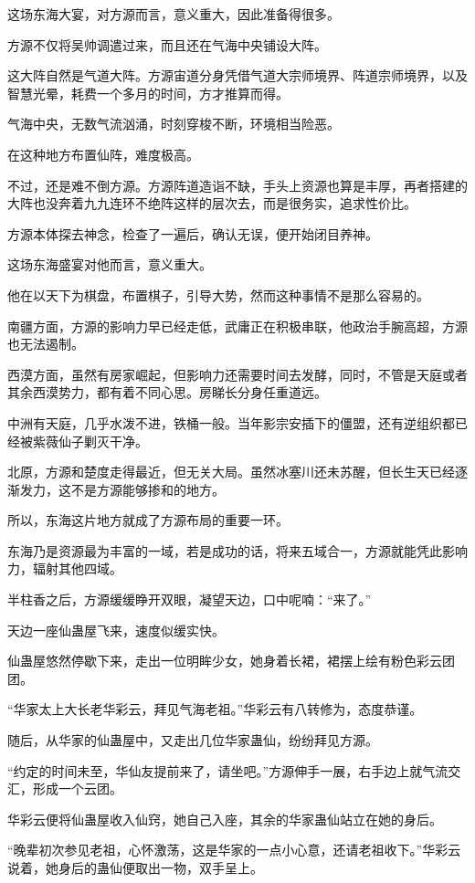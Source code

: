 \begin{this_body}
这场东海大宴，对方源而言，意义重大，因此准备得很多。

方源不仅将吴帅调遣过来，而且还在气海中央铺设大阵。

这大阵自然是气道大阵。方源宙道分身凭借气道大宗师境界、阵道宗师境界，以及智慧光晕，耗费一个多月的时间，方才推算而得。

气海中央，无数气流汹涌，时刻穿梭不断，环境相当险恶。

在这种地方布置仙阵，难度极高。

不过，还是难不倒方源。方源阵道造诣不缺，手头上资源也算是丰厚，再者搭建的大阵也没奔着九九连环不绝阵这样的层次去，而是很务实，追求性价比。

方源本体探去神念，检查了一遍后，确认无误，便开始闭目养神。

这场东海盛宴对他而言，意义重大。

他在以天下为棋盘，布置棋子，引导大势，然而这种事情不是那么容易的。

南疆方面，方源的影响力早已经走低，武庸正在积极串联，他政治手腕高超，方源也无法遏制。

西漠方面，虽然有房家崛起，但影响力还需要时间去发酵，同时，不管是天庭或者其余西漠势力，都有着不同心思。房睇长分身任重道远。

中洲有天庭，几乎水泼不进，铁桶一般。当年影宗安插下的僵盟，还有逆组织都已经被紫薇仙子剿灭干净。

北原，方源和楚度走得最近，但无关大局。虽然冰塞川还未苏醒，但长生天已经逐渐发力，这不是方源能够掺和的地方。

所以，东海这片地方就成了方源布局的重要一环。

东海乃是资源最为丰富的一域，若是成功的话，将来五域合一，方源就能凭此影响力，辐射其他四域。

半柱香之后，方源缓缓睁开双眼，凝望天边，口中呢喃：“来了。”

天边一座仙蛊屋飞来，速度似缓实快。

仙蛊屋悠然停歇下来，走出一位明眸少女，她身着长裙，裙摆上绘有粉色彩云团团。

“华家太上大长老华彩云，拜见气海老祖。”华彩云有八转修为，态度恭谨。

随后，从华家的仙蛊屋中，又走出几位华家蛊仙，纷纷拜见方源。

“约定的时间未至，华仙友提前来了，请坐吧。”方源伸手一展，右手边上就气流交汇，形成一个云团。

华彩云便将仙蛊屋收入仙窍，她自己入座，其余的华家蛊仙站立在她的身后。

“晚辈初次参见老祖，心怀激荡，这是华家的一点小心意，还请老祖收下。”华彩云说着，她身后的蛊仙便取出一物，双手呈上。


\end{this_body}
